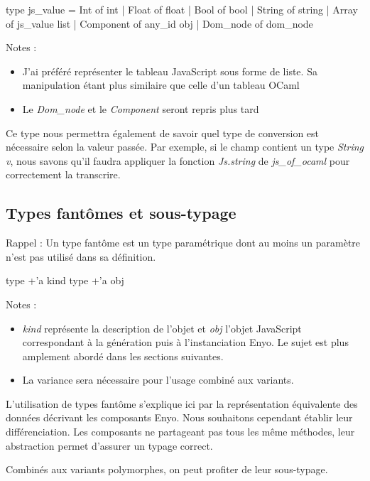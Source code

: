 \documentclass[11pt,a4paper]{report}
\begin{document}
\begin{OCaml}
  type js_value = Int of int | Float of float
                | Bool of bool | String of string
                | Array of js_value list 
                | Component of any_id obj | Dom_node of dom_node
\end{OCaml}

Notes : 
\begin{itemize}
\item J'ai préféré représenter le tableau JavaScript sous forme de liste. Sa manipulation étant 
  plus similaire que celle d'un tableau OCaml
\item Le \emph{Dom\_node} et le \emph{Component} seront repris plus tard 
\end{itemize}

Ce type nous permettra également de savoir quel type de conversion est nécessaire selon 
la valeur passée.
Par exemple, si le champ contient un type \emph{String v}, nous savons qu'il faudra appliquer
la fonction \emph{Js.string} de \emph{js\_of\_ocaml} pour correctement la transcrire.

\subsection{Types fantômes et sous-typage}

Rappel : Un type fantôme est un type paramétrique dont au moins un paramètre n'est pas utilisé
dans sa définition.

\begin{OCaml}
  type +'a kind
  type +'a obj
\end{OCaml}

Notes : 
\begin{itemize}
\item \emph{kind} représente la description de l'objet et \emph{obj} l'objet JavaScript correspondant
  à la génération puis à l'instanciation Enyo. Le sujet est plus amplement abordé dans les sections
  suivantes.
\item La variance sera nécessaire pour l'usage combiné aux variants.
\end{itemize}

L'utilisation de types fantôme s'explique ici par la représentation équivalente des données décrivant
les composants Enyo. Nous souhaitons cependant établir leur différenciation. 
Les composants ne partageant pas tous les même méthodes, leur abstraction permet d'assurer 
un typage correct.

Combinés aux variants polymorphes, on peut profiter de leur sous-typage.
\end{document}
